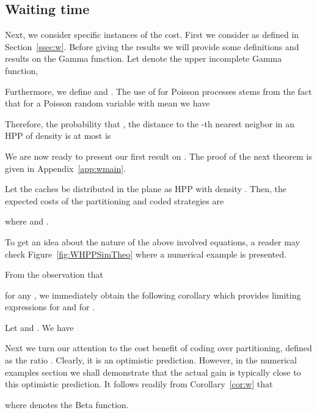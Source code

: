 \subsection{Waiting time}

Next, we consider specific instances of the cost. First we consider  as defined in Section~\ref{ssec:w}. Before giving the results we will provide some definitions and results on the Gamma function. Let  denote the upper incomplete Gamma function, \ie

Furthermore, we define  and . The use of  for Poisson processes stems from the fact that for a Poisson random variable  with mean  we have

Therefore, the probability that , the distance to the -th nearest neigbor in an HPP of density  is at most  is



We are now ready to present our first result on . The proof of the next theorem is given in Appendix~\ref{app:wmain}.
\begin{theorem} \label{th:wmain}
Let the caches be distributed in the plane as HPP with density .
Then, the expected costs of the partitioning and coded strategies are

where  and .
\end{theorem}

To get an idea about the nature of the above involved equations, a reader may check Figure~\ref{fig:WHPPSimTheo}
where a numerical example is presented.





From the observation that

for any ,
we immediately obtain the following corollary which provides limiting expressions for  and  for .
\begin{corollary} \label{cor:w}
Let  and . We have

\end{corollary}

Next we turn our attention to the cost benefit of coding over partitioning, defined as the ratio .
Clearly, it is an optimistic prediction. However, in the numerical examples section we shall demonstrate that the actual gain is
typically close to this optimistic prediction. It follows readily from Corollary~\ref{cor:w} that

where  denotes the Beta function.


